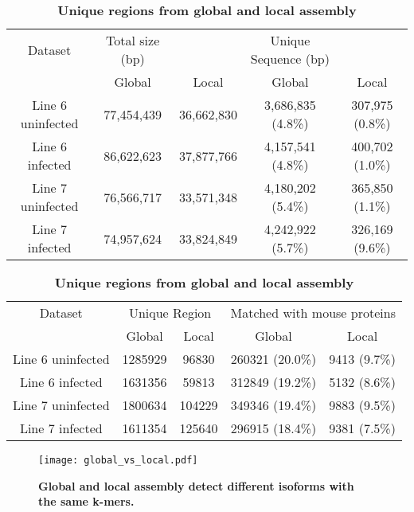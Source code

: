 \begin{table}
\caption{
\textbf{Unique sequences between global and local assembly}}
\begin{center}
\begin{tabular}{ccccc}
\hline
Dataset & Total size (bp) & & Unique Sequence (bp) & \\
        & Global & Local & Global & Local\\
\hline
Line 6 uninfected & 77,454,439 & 36,662,830 & 3,686,835 (4.8\%) & 307,975 (0.8\%)\\
Line 6 infected & 86,622,623 & 37,877,766 & 4,157,541 (4.8\%)& 400,702 (1.0\%)\\
Line 7 uninfected & 76,566,717 & 33,571,348 & 4,180,202 (5.4\%) & 365,850 (1.1\%)\\
Line 7 infected & 74,957,624 & 33,824,849 & 4,242,922 (5.7\%)& 326,169 (9.6\%)\\
\hline
\end{tabular}
\end{center}
\label{unique_sequences}

\caption{
\textbf{Unique regions from global and local assembly}}
\begin{center}
\begin{tabular}{ccccc}
\hline
Dataset & \multicolumn{2}{c}{Unique Region} & \multicolumn{2}{c}{Matched with mouse proteins}\\
 & Global & Local & Global & Local\\
\hline
Line 6 uninfected & 1285929 & 96830 & 260321 (20.0\%) & 9413 (9.7\%)\\
Line 6 infected & 1631356 & 59813 & 312849 (19.2\%)& 5132 (8.6\%)\\
Line 7 uninfected & 1800634 & 104229 & 349346 (19.4\%) & 9883 (9.5\%)\\
Line 7 infected & 1611354 & 125640 & 296915 (18.4\%)& 9381 (7.5\%)\\
\hline
\end{tabular}
\label{unique_sequences_matched_mouse}
\end{center}
\end{table}

\begin{figure}[!ht]
\begin{center}
\texttt{[image: global\_vs\_local.pdf]}
\end{center}
\caption{
    \textbf{Global and local assembly detect different isoforms with
    the same k-mers.}
}
\label{img:global_vs_local}
\end{figure}

